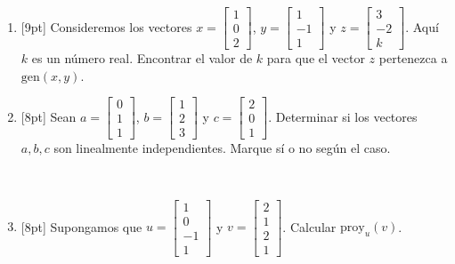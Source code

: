 \documentclass[11pt]{article}
\newcommand{\vf}{\fbox{V}\ \fbox{F}}
\begin{document}
\begin{enumerate}
\begin{enumerate}
\vf

\item{}[2pt] Si $C$ es una matriz de tamaño $4\times 4$, entonces $\det(2C) = 8\det(C)$.

\vf
\end{enumerate}

\item{}[9pt] Consideremos los vectores $x = \begin{bmatrix}1\\0\\2\end{bmatrix}$, $y = \begin{bmatrix}1\\-1\\1\end{bmatrix}$ y $z = \begin{bmatrix}3\\-2\\k\end{bmatrix}$. Aquí $k$ es un número real. Encontrar el valor de $k$ para que el vector $z$ pertenezca a $\mathrm{gen}(x,y)$.

\vspace{4pt}

\item{}[8pt] Sean $a = \begin{bmatrix}0\\1\\1\end{bmatrix}$, $b = \begin{bmatrix}1\\2\\3\end{bmatrix}$ y $c = \begin{bmatrix}2\\0\\1\end{bmatrix}$. Determinar si los vectores $a, b, c$ son linealmente independientes. Marque sí o no según el caso.

\vspace{4pt}
\ 

\item{}[8pt] Supongamos que $u = \begin{bmatrix}1\\0\\-1\\1\end{bmatrix}$ y $v = \begin{bmatrix}2\\1\\2\\1\end{bmatrix}$. Calcular $\mathrm{proy}_u(v)$.


\end{enumerate}
\end{document}
